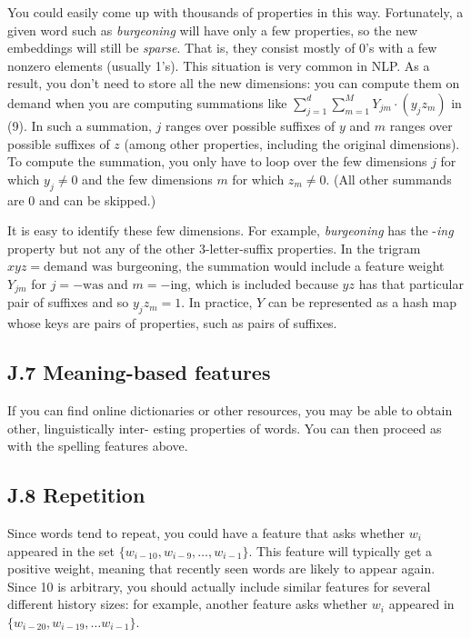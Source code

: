You could easily come up with thousands of properties in this way. Fortunately, a given word such as 
\emph{burgeoning} will have only a few properties, so the new embeddings will still be \emph{sparse}. That is, they consist 
mostly of 0’s with a few nonzero elements (usually 1’s). This situation is very common in NLP. As a result, 
you don’t need to store all the new dimensions: you can compute them on demand when you are computing 
summations like $\sum_{j=1}^d \sum_{m=1}^M Y_{jm}\cdot(y_j z_m)$ in (9). In such a summation, $j$ ranges over possible suffixes of 
$y$ and $m$ ranges over possible suffixes of $z$ (among other properties, including the original dimensions). To 
compute the summation, you only have to loop over the few dimensions $j$ for which $y_j \neq 0$ and the few 
dimensions $m$ for which $z_m \neq 0$. (All other summands are 0 and can be skipped.) 

It is easy to identify these few dimensions. For example, \emph{burgeoning} has the -\emph{ing} property but 
not any of the other 3-letter-suffix properties. In the trigram $xyz = \text{demand was burgeoning}$, the 
summation would include a feature weight $Y_{jm}$ for $j = -\text{was}$ and $m = -\text{ing}$, which is included because 
$yz$ has that particular pair of suffixes and so $y_j z_m = 1$. In practice, $Y$ can be represented as a hash map 
whose keys are pairs of properties, such as pairs of suffixes.

\subsection*{J.7 Meaning-based features}

If you can find online dictionaries or other resources, you may be able to obtain other, linguistically inter-
esting properties of words. You can then proceed as with the spelling features above.

\subsection*{J.8 Repetition}

Since words tend to repeat, you could have a feature that asks whether $w_i$ appeared in the set $\{w_{i-10}, w_{i-9}, \ldots, w_{i-1}\}$. 
This feature will typically get a positive weight, meaning that recently seen words are likely to appear again. 
Since 10 is arbitrary, you should actually include similar features for several different history sizes: for 
example, another feature asks whether $w_i$ appeared in $\{w_{i-20}, w_{i-19}, \ldots w_{i-1}\}$. 

